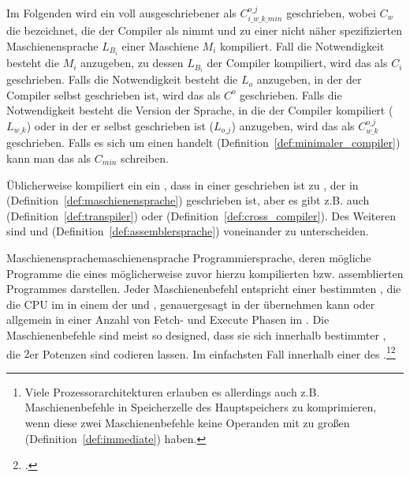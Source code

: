 \begin{Special_Paragraph}
  Im Folgenden wird ein voll ausgeschriebener  als $C_{i\_w\_k\_{min}}^{o\_j}$ geschrieben, wobei $C_w$ die  bezeichnet, die der Compiler als  nimmt und zu einer nicht näher spezifizierten Maschienensprache $L_{B_i}$ einer Maschiene $M_i$ kompiliert. Fall die Notwendigkeit besteht die  $M_i$ anzugeben, zu dessen  $L_{B_i}$ der Compiler kompiliert, wird das als $C_{i}$ geschrieben. Falls die Notwendigkeit besteht die  $L_o$ anzugeben, in der der Compiler selbst geschrieben ist, wird das als $C^o$ geschrieben. Falls die Notwendigkeit besteht die Version der Sprache, in die der Compiler kompiliert ($L_{w\_k}$) oder in der er selbst geschrieben ist ($L_{o\_j}$) anzugeben, wird das als $C_{w\_k}^{o\_j}$ geschrieben. Falls es sich um einen  handelt (Definition~\ref{def:minimaler_compiler}) kann man das als $C_{min}$ schreiben.
\end{Special_Paragraph}

Üblicherweise kompiliert ein  ein , dass in einer  geschrieben ist zu , der in  (Definition~\ref{def:maschienensprache}) geschrieben ist, aber es gibt z.B. auch  (Definition~\ref{def:transpiler}) oder  (Definition~\ref{def:cross_compiler}). Des Weiteren sind  und  (Definition~\ref{def:assemblersprache}) voneinander zu unterscheiden.

\begin{Definition}{Maschienensprache}{maschienensprache}
  Programmiersprache, deren mögliche Programme die  eines möglicherweise zuvor hierzu kompilierten bzw. assemblierten Programmes darstellen. Jeder Maschienenbefehl entspricht einer bestimmten , die die CPU im  in einem  der  und , genauergesagt in der  übernehmen kann oder allgemein in einer  Anzahl von Fetch- und Execute Phasen im . Die Maschienenbefehle sind meist so designed, dass sie sich innerhalb bestimmter , die $2$er Potenzen sind codieren lassen. Im einfachsten Fall innerhalb einer  des .\footnote{Viele Prozessorarchitekturen erlauben es allerdings auch z.B.  Maschienenbefehle in  Speicherzelle des Hauptspeichers zu komprimieren, wenn diese zwei Maschienenbefehle keine Operanden mit zu großen  (Definition~\ref{def:immediate}) haben.}\footcite{scholl_betriebssysteme_2020}
\end{Definition}


